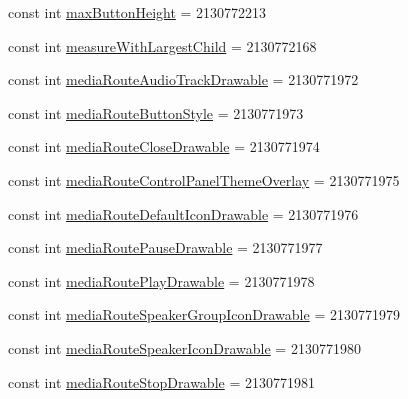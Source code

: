 \begin{DoxyCompactItemize}
\item 
const int \mbox{\hyperlink{class_f_w_p_s___app_1_1_droid_1_1_resource_1_1_attribute_a5a7b32a7820ed701ecd320c9cec0d380}{max\+Button\+Height}} = 2130772213
\item 
const int \mbox{\hyperlink{class_f_w_p_s___app_1_1_droid_1_1_resource_1_1_attribute_af757f032d634b062b38575d9bab019e3}{measure\+With\+Largest\+Child}} = 2130772168
\item 
const int \mbox{\hyperlink{class_f_w_p_s___app_1_1_droid_1_1_resource_1_1_attribute_a62c5023e5a628756fff6b76e9aff2bde}{media\+Route\+Audio\+Track\+Drawable}} = 2130771972
\item 
const int \mbox{\hyperlink{class_f_w_p_s___app_1_1_droid_1_1_resource_1_1_attribute_a9bb98a128bc0e6b0831e020fc4f53df1}{media\+Route\+Button\+Style}} = 2130771973
\item 
const int \mbox{\hyperlink{class_f_w_p_s___app_1_1_droid_1_1_resource_1_1_attribute_a594b3e12a302e2ca8af870e2a20810c9}{media\+Route\+Close\+Drawable}} = 2130771974
\item 
const int \mbox{\hyperlink{class_f_w_p_s___app_1_1_droid_1_1_resource_1_1_attribute_aed7466372b1de79e13286242d00e6a78}{media\+Route\+Control\+Panel\+Theme\+Overlay}} = 2130771975
\item 
const int \mbox{\hyperlink{class_f_w_p_s___app_1_1_droid_1_1_resource_1_1_attribute_a7bce4b947626ddafed8dd8ef83e2235b}{media\+Route\+Default\+Icon\+Drawable}} = 2130771976
\item 
const int \mbox{\hyperlink{class_f_w_p_s___app_1_1_droid_1_1_resource_1_1_attribute_a8d8830efc7f03f477bf00401ca334230}{media\+Route\+Pause\+Drawable}} = 2130771977
\item 
const int \mbox{\hyperlink{class_f_w_p_s___app_1_1_droid_1_1_resource_1_1_attribute_a931aed43d49d59c17ee53c0356ce7ddc}{media\+Route\+Play\+Drawable}} = 2130771978
\item 
const int \mbox{\hyperlink{class_f_w_p_s___app_1_1_droid_1_1_resource_1_1_attribute_a065c06aa87d25616dbb5fea743b01e89}{media\+Route\+Speaker\+Group\+Icon\+Drawable}} = 2130771979
\item 
const int \mbox{\hyperlink{class_f_w_p_s___app_1_1_droid_1_1_resource_1_1_attribute_a0fbeccf76d8ae4c81397f29a200d33b8}{media\+Route\+Speaker\+Icon\+Drawable}} = 2130771980
\item 
const int \mbox{\hyperlink{class_f_w_p_s___app_1_1_droid_1_1_resource_1_1_attribute_af64b2ab95342d0dc12d289784caa2bcc}{media\+Route\+Stop\+Drawable}} = 2130771981
\item 

\end{DoxyCompactItemize}
